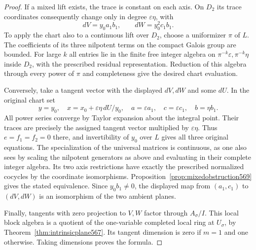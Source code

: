 \documentclass[a4paper,11pt]{article}
\theoremstyle{definition}
\theoremstyle{remark}
\numberwithin{equation}{section}
\begin{document}
\begin{proof}
If a mixed lift exists, the trace is constant on each
axis. On \(D_2\) its trace coordinates consequently change
only in degree \(\varepsilon\eta\), with
\[
                  dV=y_0 a_1 b_1,\qquad
                  dW=y_0^2 c_1 b_1 .
\]
To apply the chart also to a continuous lift over \(D_2\),
choose a uniformizer \(\pi\) of \(L\). The coefficients of
its three nilpotent terms on the compact Galois group are
bounded. For large \(k\) all entries lie in the finite
free integer algebra on \(\pi^{-k}\varepsilon,\pi^{-k}\eta\)
inside \(D_2\), with the prescribed residual representation.
Reduction of this algebra through every power of \(\pi\)
and completeness give the desired chart evaluation.

Conversely, take a tangent vector with the displayed
\(dV,dW\) and some \(dU\). In the original chart set
\[
  y=y_0,\quad x=x_0+\varepsilon\eta\,dU/y_0,\quad
  a=\varepsilon a_1,\quad c=\varepsilon c_1,\quad b=\eta b_1 .
\]
All power series converge by Taylor expansion about the
integral point. Their traces are precisely the assigned
tangent vector multiplied by \(\varepsilon\eta\). Thus
\(e=f_1=f_2=0\) there, and invertibility of \(y_0\) over
\(L\) gives all three original equations. The specialization
of the universal matrices is continuous, as one also sees
by scaling the nilpotent generators as above and evaluating
in their complete integer algebra. Its two axis restrictions
have exactly the prescribed normalized cocycles by the
coordinate isomorphisms. Proposition~\ref{prop:mixedobstruction569}
gives the stated equivalence. Since \(y_0b_1\ne0\), the
displayed map from \((a_1,c_1)\) to \((dV,dW)\) is an
isomorphism of the two ambient planes.

Finally, tangents with zero projection to \(V,W\) factor
through \(A_\sigma/I\). This local block algebra is a
quotient of the one-variable completed local ring at
\(U_\sigma\), by Theorem~\ref{thm:intrinsicplane567}.
Its tangent dimension is zero if \(m=1\) and one otherwise.
Taking dimensions proves the formula.
\end{proof}
\end{document}
